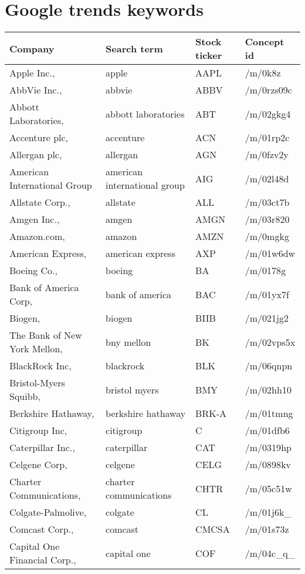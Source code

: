 \section{Google trends keywords}

\begin{longtable}[c]{llll}
\label{app:company_terms} 
\textbf{Company} & \textbf{Search term} & \textbf{Stock ticker} & \textbf{Concept id} \\
\endhead
%
Apple Inc., & apple & AAPL & /m/0k8z \\
AbbVie Inc., & abbvie & ABBV & /m/0rzs09c \\
Abbott Laboratories, & abbott laboratories & ABT & /m/02gkg4 \\
Accenture plc, & accenture & ACN & /m/01rp2c \\
Allergan plc, & allergan & AGN & /m/0fzv2y \\
American International Group& american international group & AIG & /m/02l48d \\
Allstate Corp., & allstate & ALL & /m/03ct7b \\
Amgen Inc., & amgen & AMGN & /m/03r820 \\
Amazon.com, & amazon & AMZN & /m/0mgkg \\
American Express, & american express & AXP & /m/01w6dw \\
Boeing Co., & boeing & BA & /m/0178g \\
Bank of America Corp, & bank of america & BAC & /m/01yx7f \\
Biogen, & biogen & BIIB & /m/021jg2 \\
The Bank of New York Mellon, & bny mellon & BK & /m/02vps5x \\
BlackRock Inc, & blackrock & BLK & /m/06qnpn \\
Bristol-Myers Squibb, & bristol myers & BMY & /m/02hh10 \\
Berkshire Hathaway, & berkshire hathaway & BRK-A & /m/01tmng \\
Citigroup Inc, & citigroup & C & /m/01dfb6 \\
Caterpillar Inc., & caterpillar & CAT & /m/0319hp \\
Celgene Corp, & celgene & CELG & /m/0898kv \\
Charter Communications, & charter communications & CHTR & /m/05c51w \\
Colgate-Palmolive, & colgate & CL & /m/01j6k\_ \\
Comcast Corp., & comcast & CMCSA & /m/01s73z \\
Capital One Financial Corp., & capital one & COF & /m/04c\_q\_ \\

\end{longtable}
